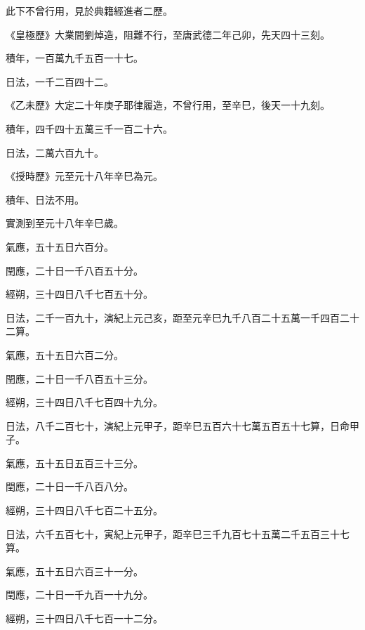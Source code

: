 \begin{pinyinscope}
 此下不曾行用，見於典籍經進者二歷。



 《皇極歷》大業間劉焯造，阻難不行，至唐武德二年己卯，先天四十三刻。



 積年，一百萬九千五百一十七。



 日法，一千二百四十二。



 《乙未歷》大定二十年庚子耶律履造，不曾行用，至辛巳，後天一十九刻。



 積年，四千四十五萬三千一百二十六。



 日法，二萬六百九十。



 《授時歷》元至元十八年辛巳為元。



 積年、日法不用。



 實測到至元十八年辛巳歲。



 氣應，五十五日六百分。



 閏應，二十日一千八百五十分。



 經朔，三十四日八千七百五十分。



 日法，二千一百九十，演紀上元己亥，距至元辛巳九千八百二十五萬一千四百二十二算。



 氣應，五十五日六百二分。



 閏應，二十日一千八百五十三分。



 經朔，三十四日八千七百四十九分。



 日法，八千二百七十，演紀上元甲子，距辛巳五百六十七萬五百五十七算，日命甲子。



 氣應，五十五日五百三十三分。



 閏應，二十日一千八百八分。



 經朔，三十四日八千七百二十五分。



 日法，六千五百七十，寅紀上元甲子，距辛巳三千九百七十五萬二千五百三十七算。



 氣應，五十五日六百三十一分。



 閏應，二十日一千九百一十九分。



 經朔，三十四日八千七百一十二分。



\end{pinyinscope}